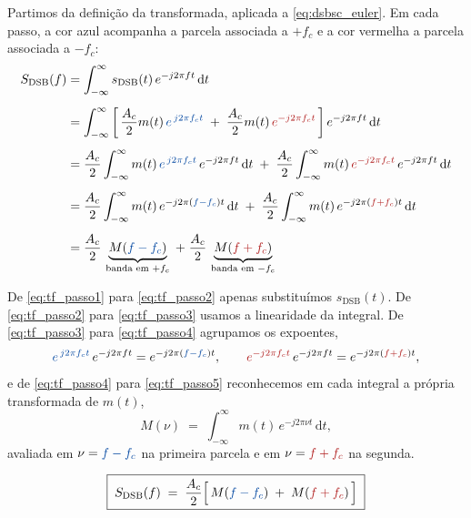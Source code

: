 \documentclass[11pt,a4paper]{article}
\newcommand{\DSB}{\text{DSB}}
\newcommand{\dd}{\,\mathrm{d}}
\begin{document}
Partimos da definição da transformada, aplicada a \eqref{eq:dsbsc_euler}. Em cada passo, a cor azul acompanha a parcela associada a $+f_c$ e a cor vermelha a parcela associada a $-f_c$:
\begin{align}
  S_{\DSB}(f)
  &= \int_{-\infty}^{\infty} s_{\DSB}(t)\, e^{-j2\pi f t}\dd t
  \label{eq:tf_passo1}\\[0.5em]
  &= \int_{-\infty}^{\infty}
     \left[\,\frac{A_c}{2} m(t)\, \textcolor{azul}{e^{\,j2\pi f_c t}}
     \;+\; \frac{A_c}{2} m(t)\, \textcolor{vermelho}{e^{-j2\pi f_c t}}\,\right]
     e^{-j2\pi f t}\dd t
  \label{eq:tf_passo2}\\[0.5em]
  &= \frac{A_c}{2}\int_{-\infty}^{\infty} m(t)\, \textcolor{azul}{e^{\,j2\pi f_c t}}\, e^{-j2\pi f t}\dd t
   \;+\; \frac{A_c}{2}\int_{-\infty}^{\infty} m(t)\, \textcolor{vermelho}{e^{-j2\pi f_c t}}\, e^{-j2\pi f t}\dd t
  \label{eq:tf_passo3}\\[0.5em]
  &= \frac{A_c}{2}\int_{-\infty}^{\infty} m(t)\,
       e^{-j2\pi \left(\textcolor{azul}{f-f_c}\right) t}\dd t
   \;+\; \frac{A_c}{2}\int_{-\infty}^{\infty} m(t)\,
       e^{-j2\pi \left(\textcolor{vermelho}{f+f_c}\right) t}\dd t
  \label{eq:tf_passo4}\\[0.5em]
  &= \frac{A_c}{2}\, \underbrace{M(\textcolor{azul}{f-f_c})}_{\text{banda em } +f_c}
   \;+\; \frac{A_c}{2}\, \underbrace{M(\textcolor{vermelho}{f+f_c})}_{\text{banda em } -f_c}
  \label{eq:tf_passo5}
\end{align}

De \eqref{eq:tf_passo1} para \eqref{eq:tf_passo2} apenas substituímos $s_{\DSB}(t)$. De \eqref{eq:tf_passo2} para \eqref{eq:tf_passo3} usamos a linearidade da integral. De \eqref{eq:tf_passo3} para \eqref{eq:tf_passo4} agrupamos os expoentes,
\[
  \textcolor{azul}{e^{\,j2\pi f_c t}}\, e^{-j2\pi f t} = e^{-j2\pi(\textcolor{azul}{f-f_c})t},
  \qquad
  \textcolor{vermelho}{e^{-j2\pi f_c t}}\, e^{-j2\pi f t} = e^{-j2\pi(\textcolor{vermelho}{f+f_c})t},
\]
e de \eqref{eq:tf_passo4} para \eqref{eq:tf_passo5} reconhecemos em cada integral a própria transformada de $m(t)$,
\[
  M(\nu) \;=\; \int_{-\infty}^{\infty} m(t)\, e^{-j2\pi \nu t}\dd t,
\]
avaliada em $\nu = \textcolor{azul}{f-f_c}$ na primeira parcela e em $\nu = \textcolor{vermelho}{f+f_c}$ na segunda.

\begin{quadro}
\[
  \boxed{\;S_{\DSB}(f) \;=\; \frac{A_c}{2}\Bigl[\, M(\textcolor{azul}{f-f_c}) \;+\; M(\textcolor{vermelho}{f+f_c}) \,\Bigr]\;}
\]
\end{quadro}
\end{document}
